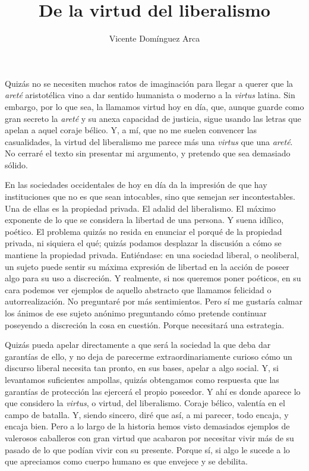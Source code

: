\documentclass[12pt,a4paper]{article}
\title{De la virtud del liberalismo}
\author{Vicente Domínguez Arca}
\date{}
\begin{document}
\maketitle

Quizás no se necesiten muchos ratos de imaginación para llegar a querer que la \emph{areté} aristotélica vino a dar sentido humanista o moderno a la \emph{virtus} latina. Sin embargo, por lo que sea, la llamamos virtud hoy en día, que, aunque guarde como gran secreto la \emph{areté} y su anexa capacidad de justicia, sigue usando las letras que apelan a aquel coraje bélico. Y, a mí, que no me suelen convencer las casualidades, la virtud del liberalismo me parece más una \emph{virtus} que una \emph{areté}. No cerraré el texto sin presentar mi argumento, y pretendo que sea demasiado sólido.

En las sociedades occidentales de hoy en día da la impresión de que hay instituciones que no es que sean intocables, sino que semejan ser incontestables. Una de ellas es la propiedad privada. El adalid del liberalismo. El máximo exponente de lo que se considera la libertad de una persona. Y suena idílico, poético. El problema quizás no resida en enunciar el porqué de la propiedad privada, ni siquiera el qué; quizás podamos desplazar la discusión a cómo se mantiene la propiedad privada. Entiéndase: en una sociedad liberal, o neoliberal, un sujeto puede sentir su máxima expresión de libertad en la acción de poseer algo para su uso a discreción. Y realmente, si nos queremos poner poéticos, en su cara podemos ver ejemplos de aquello abstracto que llamamos felicidad o autorrealización. No preguntaré por más sentimientos. Pero sí me gustaría calmar los ánimos de ese sujeto anónimo preguntando cómo pretende continuar poseyendo a discreción la cosa en cuestión. Porque necesitará una estrategia.

Quizás pueda apelar directamente a que será la sociedad la que deba dar garantías de ello, y no deja de parecerme extraordinariamente curioso cómo un discurso liberal necesita tan pronto, en sus bases, apelar a algo social. Y, si levantamos suficientes ampollas, quizás obtengamos como respuesta que las garantías de protección las ejercerá el propio poseedor. Y ahí es donde aparece lo que considero la \emph{virtus}, o virtud, del liberalismo. Coraje bélico, valentía en el campo de batalla. Y, siendo sincero, diré que así, a mi parecer, todo encaja, y encaja bien. Pero a lo largo de la historia hemos visto demasiados ejemplos de valerosos caballeros con gran virtud que acabaron por necesitar vivir más de su pasado de lo que podían vivir con su presente. Porque sí, si algo le sucede a lo que apreciamos como cuerpo humano es que envejece y se debilita.
\end{document}
